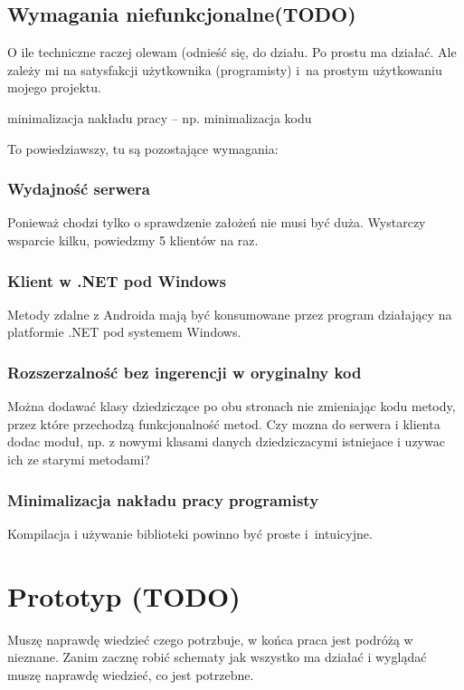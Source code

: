 

\subsection{Wymagania niefunkcjonalne(TODO)}
O ile techniczne raczej olewam (odnieść się, do działu. Po prostu ma działać.
Ale zależy mi na satysfakcji użytkownika (programisty) i~na prostym użytkowaniu mojego projektu.

minimalizacja nakładu pracy -- np. minimalizacja kodu

To powiedziawszy, tu są pozostające wymagania:

\subsubsection{Wydajność serwera}
Ponieważ chodzi tylko o sprawdzenie założeń nie musi być duża. Wystarczy wsparcie kilku, powiedzmy 5 klientów na raz.

\subsubsection{Klient w .NET pod Windows}
Metody zdalne z Androida mają być konsumowane przez program działający na platformie .NET pod systemem Windows.

\subsubsection{Rozszerzalność bez ingerencji w oryginalny kod}
Można dodawać klasy dziedziczące po obu stronach nie zmieniając kodu metody, przez które przechodzą funkcjonalność metod.
Czy mozna do serwera i klienta dodac moduł, np.
z nowymi klasami danych dziedziczacymi istniejace
i uzywac ich ze starymi metodami?

\subsubsection{Minimalizacja nakładu pracy programisty}
Kompilacja i używanie biblioteki powinno być proste i~intuicyjne.



\section{Prototyp (TODO)}
Muszę naprawdę wiedzieć czego potrzbuje, w końca praca jest podróżą w nieznane. Zanim zacznę robić schematy jak wszystko ma działać i wyglądać muszę naprawdę wiedzieć, co jest potrzebne.

